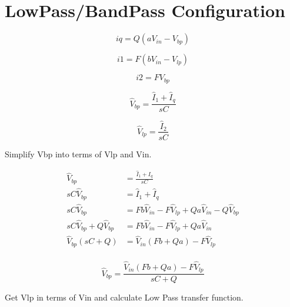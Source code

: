 \documentclass{article}
\begin{document}
\section{LowPass/BandPass Configuration}

\begin{equation}
  iq = Q(aV_{in} - V_{bp})
\end{equation}


\begin{equation}
  i1 = F(bV_{in} - V_{lp})
\end{equation}

\begin{equation}
  i2 = FV_{bp}
\end{equation}

\begin{equation}
  \hat{V}_{bp} = \frac{\hat{I}_1 + \hat{I}_q}{sC}
\end{equation}

\begin{equation}
  \hat{V}_{lp} = \frac{\hat{I}_2}{sC}
\end{equation}

Simplify Vbp into terms of Vlp and Vin.

\begin{equation*}
\begin{split}
  \hat{V}_{bp} & = \frac{\hat{I}_1 + \hat{I}_q}{sC} \\
  sC\hat{V}_{bp} & = \hat{I}_1 + \hat{I}_q \\
  sC\hat{V}_{bp} & = Fb\hat{V}_{in} - F\hat{V}_{lp} + Qa\hat{V}_{in} - Q\hat{V}_{bp} \\
  sC\hat{V}_{bp} + Q\hat{V}_{bp} & = Fb\hat{V}_{in} - F\hat{V}_{lp} + Qa\hat{V}_{in}\\
  \hat{V}_{bp}(sC + Q) & = \hat{V}_{in}(Fb + Qa) - F\hat{V}_{lp} \\
\end{split}
\end{equation*}

\begin{equation}
  \hat{V}_{bp} = \frac{\hat{V}_{in}(Fb + Qa) - F\hat{V}_{lp}}{sC + Q}
\end{equation}

Get Vlp in terms of Vin and calculate Low Pass transfer function.
\end{document}
